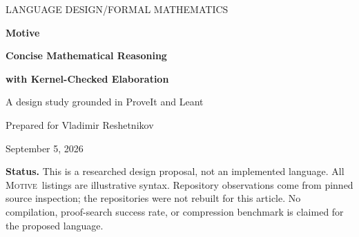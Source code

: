 \documentclass[11pt,a4paper]{article}
\newcommand{\Motive}{\textnormal{\textsc{Motive}}}
\theoremstyle{remark}
\begin{document}
\begin{titlepage}
\thispagestyle{empty}
\vspace*{12mm}
{\sffamily\large\color{ink}LANGUAGE DESIGN\quad /\quad FORMAL MATHEMATICS\par}
\vspace{12mm}
{\Huge\bfseries\color{ink}Motive\par}
\vspace{5mm}
{\LARGE\bfseries Concise Mathematical Reasoning\par}
\vspace{2mm}
{\LARGE\bfseries with Kernel-Checked Elaboration\par}
\vspace{9mm}
{\large A design study grounded in ProveIt and Leant\par}
\vspace{5mm}
{\normalsize Prepared for Vladimir Reshetnikov\par September 5, 2026\par}
\vspace{12mm}
\begin{abstract}
A mathematician may regard a proof as a substitution, a familiar identity, and a change of summation order. A formal development must also identify the precise types, justify the change of index, transport equalities, and discharge every side condition. The right response is not to discard these obligations, but to change who writes them. This article proposes \Motive, a provisional design for a mathematical proof language in which authors supply the structural decisions and the system reconstructs bounded, locally specified details. Its central object is a \emph{proof move with a contract}: a mathematical action accompanied by an exact input context, explicit output, generated obligations, and a kernel-checkable assembly procedure.

The proposal is grounded in three ProveIt developments---binomial inversion, elementary Lambert $W$ bounds, and geometric Richardson polynomials---and in Leant's separation of synthesis, candidate identity, and verification. Worked examples show what can safely become implicit and what must remain visible. The article gives an operational architecture, core elaboration rules, a relative soundness argument, a skeptical treatment of search failure, and a design for replayable proof artifacts. It also addresses statement fidelity, scope, classical assumptions, explanatory provenance, and fair evaluation. The proposed implementation is a layer over Lean rather than a replacement for its logic or mathematical library.
\end{abstract}
\vfill
\begin{designbox}
\textbf{Status.} This is a researched design proposal, not an implemented language. All \Motive\ listings are illustrative syntax. Repository observations come from pinned source inspection; the repositories were not rebuilt for this article. No compilation, proof-search success rate, or compression benchmark is claimed for the proposed language.
\end{designbox}
\end{titlepage}
\tableofcontents
\newpage
\end{document}
